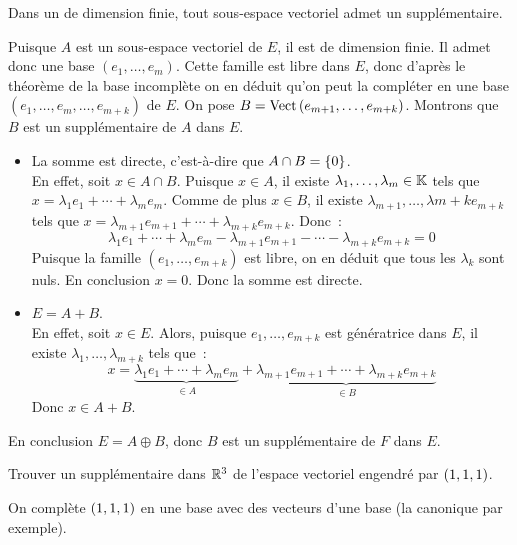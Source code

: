 \documentclass{magnolia}
\begin{document}
\begin{proposition}[utile=2]
Dans un \Kev de dimension finie, tout sous-espace vectoriel admet un
supplémentaire.
\end{proposition}
\begin{preuve}
Puisque $A$ est un sous-espace vectoriel de $E$, il est de dimension finie.
Il admet donc une base $(e_1,\ldots,e_m)$. Cette famille est libre dans $E$, donc
d'après le théorème de la base incomplète on en déduit qu'on peut la
compléter en une base $(e_1,\ldots,e_m,\ldots,e_{m+k})$ de $E$. On pose
$B=\operatorname{Vect}\left(e_{m+1},\ldots,e_{m+k}\right)$. Montrons que $B$ est un supplémentaire de
$A$ dans $E$.
\begin{itemize}
\item La somme est directe, c'est-à-dire que $A\cap B=\left\{0\right\}$.\\
  En effet, soit $x\in A\cap B$. Puisque $x\in A$, il existe
  $\lambda_1,\ldots,\lambda_m\in\mathbb{K}$ tels que $x=\lambda_1 e_1+\cdots+
  \lambda_m e_m$. Comme de plus $x\in B$, il existe $\lambda_{m+1},\ldots,
  \lambda{m+k} e_{m+k}$ tels que $x=\lambda_{m+1} e_{m+1}+\cdots+
  \lambda_{m+k}e_{m+k}$. Donc~:
  \[\lambda_1 e_1+\cdots+\lambda_m e_m -\lambda_{m+1} e_{m+1}-\cdots-
    \lambda_{m+k}e_{m+k}=0\]
  Puisque la famille $(e_1,\ldots,e_{m+k})$ est libre, on en déduit que tous les
  $\lambda_k$ sont nuls. En conclusion $x=0$. Donc la somme est directe.
\item $E=A+B$.\\
  En effet, soit $x\in E$. Alors, puisque $e_1,\ldots,e_{m+k}$ est génératrice
  dans $E$, il existe $\lambda_1,\ldots,\lambda_{m+k}$ tels que~:
  \[x=\underbrace{\lambda_1 e_1+\cdots+\lambda_m e_m}_{\in A} +
      \underbrace{\lambda_{m+1} e_{m+1}+\cdots+\lambda_{m+k} e_{m+k}}_{\in B}\]
  Donc $x\in A+B$.
\end{itemize}
En conclusion $E=A\oplus B$, donc $B$ est un supplémentaire de $F$ dans $E$.
\end{preuve}

\begin{exoUnique}
\exo Trouver un supplémentaire dans $\mathbb{R}^3$ de l'espace vectoriel engendré par $\left(1,1,1\right)$.
  \begin{sol}
  On complète $\left(1,1,1\right)$ en une base avec des vecteurs d'une base (la canonique par exemple).
  \end{sol}
\end{exoUnique}
\end{document}

